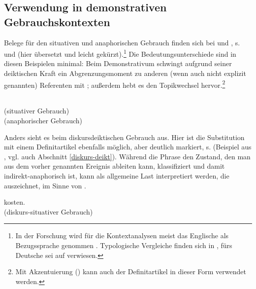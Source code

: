 \subsection{Verwendung in demonstrativen Gebrauchskontexten}\label{sec:definitartikel-in-demonstrativ}

Belege für den situativen und anaphorischen Gebrauch finden sich bei \textcite[110-111]{Hawkins1978} und \textcite[36]{Himmelmann1997}, s.  und  (hier übersetzt und leicht gekürzt).\footnote{In der Forschung wird für die Kontextanalysen meist das Englische als Bezugssprache genommen \parencite{Christophersen1939, Lobner1985,Lyons1999}. Typologische Vergleiche finden sich in \textcite{Himmelmann1997}, fürs Deutsche sei auf \textcite{Bisle-Muller1991} verwiesen.} Die Bedeutungsunterschiede sind in diesen Beispielen minimal: Beim Demonstrativum schwingt aufgrund seiner deiktischen Kraft ein Abgrenzungsmoment zu anderen (wenn auch nicht explizit genannten) Referenten mit \parencite{Bisle-Muller1991}; außerdem hebt es den Topikwechsel hervor.\footnote{Mit Akzentuierung () kann auch der Definitartikel in dieser Form verwendet werden.}   

\begin{exe}
	\ex \label{ex:sitdef}   \\(situativer Gebrauch)
	\ex \label{ex:anadef}  \\(anaphorischer Gebrauch)
\end{exe}

Anders sieht es beim diskursdeiktischen Gebrauch aus. Hier ist die Substitution mit einem Definitartikel ebenfalls möglich, aber deutlich markiert, s.  (Beispiel aus \cite[95]{Marx2011}, vgl. auch Abschnitt \ref{diskurs-deikt}). Während die Phrase  den Zustand, den man aus dem vorher genannten Ereignis ableiten kann, klassifiziert und damit indirekt-anaphorisch ist, kann  als allgemeine Last interpretiert werden, die  auszeichnet, im Sinne von .

\begin{exe}
	\ex \label{ex:diskurs-deikt-def}   kosten. \\(diskurs-situativer Gebrauch)
	 \end{exe}

